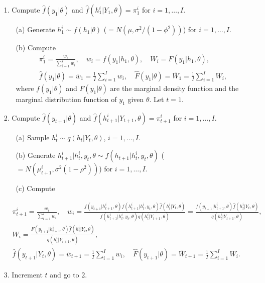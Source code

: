 \begin{itemize}
    \item[1.] Compute $\hat{f}(y_1|\theta)$ and $\hat{f}(h_1^i| Y_1, \theta) = \pi_1^i$ for $i = 1, \dots, I$. 
    
    \begin{itemize}
        \item[(a)] Generate $h_1^i \sim f(h_1|\theta)$ ($= N(\mu, \sigma^2/(1-\phi^2))$) for $i = 1, \dots, I$.
        
        \item[(b)] Compute
        \begin{align*}
            &\pi_1^i = \frac{w_i}{\sum_{i=1}^I w_i}, \quad
            w_i = f(y_1|h_1, \theta), \quad 
            W_i = F(y_1|h_1, \theta), \\
            &\hat{f}(y_1|\theta) = \overline{w}_1 = \frac{1}{I} \sum_{i=1}^I w_i, \quad
            \hat{F}(y_1|\theta) = \overline{W}_1 = \frac{1}{I} \sum_{i=1}^I W_i,
        \end{align*}
        where $f(y_1|\theta)$ and $F(y_1|\theta)$ are the marginal density function and the marginal distribution function of $y_1$ given $\theta$. Let $t = 1$.
    \end{itemize}

    \item[2.] Compute $\hat{f}(y_{t+1}|\theta)$ and $\hat{f}(h_{t+1}^i| Y_{t+1}, \theta) = \pi_{t+1}^i$ for $i = 1, \dots, I$.
    
    \begin{itemize}
        \item[(a)] Sample $h_t^i \sim q(h_t| Y_t, \theta)$, $i = 1, \dots, I$.

        \item[(b)] Generate $h_{t+1}^i| h_t^i, y_t, \theta \sim f(h_{t+1}| h_t^i, y_t, \theta)$ ($= N(\mu_{t+1}^i, \sigma^2(1-\rho^2))$) for $i = 1, \dots, I$.  

        \item[(c)] Compute
    \end{itemize}
       \begin{align*}
            &\pi_{t+1}^i = \frac{w_i}{\sum_{i=1}^I w_i}, \quad
            w_i = \frac{ f(y_{t+1}|h_{t+1}^i, \theta) f(h_{t+1}^i| h_t^i, y_t, \theta) \hat{f}(h_t^i| Y_t, \theta) }{ f(h_{t+1}^i| h_t^i, y_t, \theta) q(h_t^i| Y_{t+1}, \theta) } = \frac{ f(y_{t+1}|h_{t+1}^i, \theta) \hat{f}(h_t^i| Y_t, \theta) }{ q(h_t^i| Y_{t+1}, \theta) }, \\ 
            &W_i = \frac{ F(y_{t+1}|h_{t+1}^i, \theta) \hat{f}(h_t^i| Y_t, \theta) }{ q(h_t^i| Y_{t+1}, \theta) }, \\
            &\hat{f}(y_{t+1}| Y_t, \theta) = \overline{w}_{t+1} = \frac{1}{I} \sum_{i=1}^I w_i, \quad
            \hat{F}(y_{t+1}|\theta) = \overline{W}_{t+1} = \frac{1}{I} \sum_{i=1}^I W_i.
        \end{align*}    

        \item[3.] Increment $t$ and go to 2.
\end{itemize}
